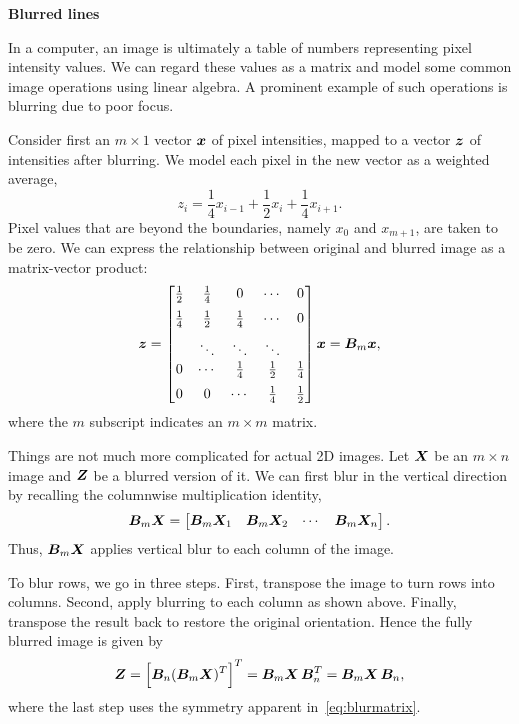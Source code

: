 \documentclass[11pt,twoside]{article}
\begin{document}
\begin{center}
  \bf Blurred lines
\end{center}

In a computer, an image is ultimately a table of numbers representing pixel intensity values. We can regard these values as a matrix and model some common image operations using linear
algebra. A prominent example of such operations is blurring due to poor focus. 

Consider first an $m\times 1$ vector $\bm{x}$ of pixel intensities, mapped to a
vector $\bm{z}$ of intensities after blurring. We model each pixel
in the new vector as a weighted average,
\[
z_i = \frac{1}{4}x_{i-1} + \frac{1}{2}x_i + \frac{1}{4} x_{i+1}.
\]
Pixel values that are beyond the boundaries, namely $x_0$ and $x_{m+1}$, are taken to be zero.  We can express the relationship between original and blurred image as a matrix-vector product:
\begin{equation}
\label{eq:blurmatrix}
\bm{z} = 
\begin{bmatrix}
  \frac{1}{2} & \frac{1}{4} & 0           & \cdots      & 0           \\[2mm]
  \frac{1}{4} & \frac{1}{2} & \frac{1}{4} & \cdots      & 0           \\[2mm]
              & \ddots      & \ddots      & \ddots      &             \\
  0           & \cdots      & \frac{1}{4} & \frac{1}{2} & \frac{1}{4} \\[2mm]
  0           & 0           & \cdots      & \frac{1}{4} & \frac{1}{2} 
\end{bmatrix}
\bm{x} = \bm{B}_m \bm{x},
\end{equation}
where the $m$ subscript indicates an $m\times m$ matrix. 

Things are not much more complicated for actual 2D images. Let $\bm{X}$
be an $m\times n$ image and $\bm{Z}$ be a blurred version of
it. We can first blur in the vertical direction by recalling the columnwise multiplication identity,
\[
\bm{B}_m \bm{X} = 
\begin{bmatrix}
  \bm{B}_m \bm{X}_1 & \bm{B}_m \bm{X}_2 & \cdots & \bm{B}_m \bm{X}_n
\end{bmatrix}.
\]
Thus, $\bm{B}_m\bm{X}$ applies vertical blur to each column of the image. 

To blur rows, we go in three steps. First, transpose the image to turn rows into columns. Second, apply blurring to each column as shown above. Finally, transpose the result back to restore the original orientation. Hence the fully blurred image is given by
\begin{equation}
\label{eq:blurop}
  \bm{Z} = \Bigl[ \bm{B}_n(\bm{B}_m\bm{X})^T \Bigr]^T = \bm{B}_m \bm{X} \, \bm{B}_n^T = \bm{B}_m \bm{X} \, \bm{B}_n, 
\end{equation}
where the last step uses the symmetry apparent in~\eqref{eq:blurmatrix}. 
\end{document}
